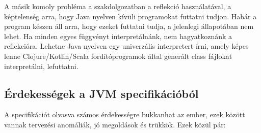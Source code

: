 A másik komoly probléma a szakdolgozatban a reflekció használatával, a képtelenség arra, hogy Java nyelven kívüli programokat futtatni tudjon. Habár a program készen áll arra, hogy ezeket futtatni tudja, a jelenlegi állapotában nem lehet. Ha minden egyes függvényt interpretálnánk, nem hagyatkoznánk a reflekcióra. Lehetne Java nyelven egy univerzális interpretert írni, amely képes lenne Clojure/Kotlin/Scala fordítóprogramok által generált class fájlokat interpretálni, lefuttatni.

\subsection{Érdekességek a JVM specifikációból}

A specifikációt olvasva számos érdekességre bukkanhat az ember, ezek között vannak tervezési anomáliák, jó megoldások és trükkök. Ezek közül pár:

